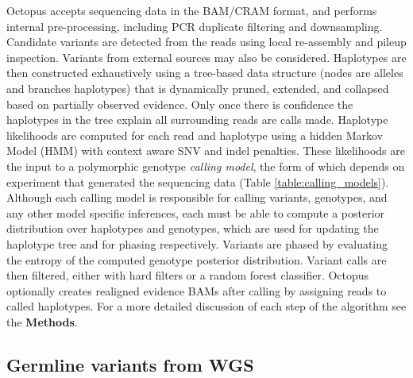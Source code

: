 \documentclass[notitlepage, twocolumn]{article}
\begin{document}
Octopus accepts sequencing data in the BAM/CRAM format, and performs internal pre-processing, including PCR duplicate filtering and downsampling. Candidate variants are detected from the reads using local re-assembly and pileup inspection. Variants from external sources may also be considered. Haplotypes are then constructed exhaustively using a tree-based data structure (nodes are alleles and branches haplotypes) that is dynamically pruned, extended, and collapsed based on partially observed evidence. Only once there is confidence the haplotypes in the tree explain all surrounding reads are calls made. Haplotype likelihoods are computed for each read and haplotype using a hidden Markov Model (HMM) with context aware SNV and indel penalties. These likelihoods are the input to a polymorphic genotype \emph{calling model}, the form of which depends on experiment that generated the sequencing data (Table \ref{table:calling_models}). Although each calling model is responsible for calling variants, genotypes, and any other model specific inferences, each must be able to compute a posterior distribution over haplotypes and genotypes, which are used for updating the haplotype tree and for phasing respectively. Variants are phased by evaluating the entropy of the computed genotype posterior distribution. Variant calls are then filtered, either with hard filters or a random forest classifier. Octopus optionally creates realigned evidence BAMs after calling by assigning reads to called haplotypes. For a more detailed discussion of each step of the algorithm see the \textbf{Methods}.

\subsection*{Germline variants from WGS}
\end{document}
